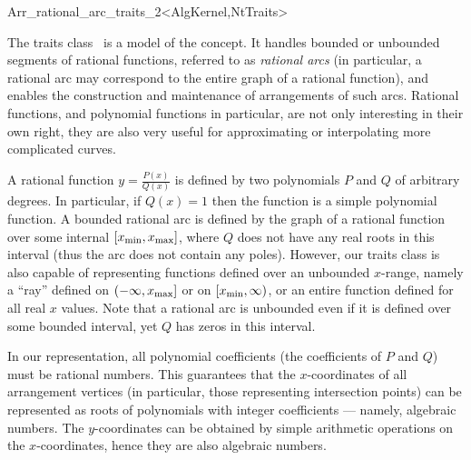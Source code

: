 
\ccRefPageBegin
\begin{ccRefClass}{Arr_rational_arc_traits_2<AlgKernel,NtTraits>}

\ccDefinition

The traits class \ccRefName\ is a model of the 
concept. It handles bounded or unbounded segments of rational functions,
referred to as {\sl rational arcs} (in particular, a rational arc may
correspond to the entire graph of a rational function), and enables the
construction and maintenance of arrangements of such arcs. Rational
functions, and polynomial functions in particular, are not only interesting
in their own right, they are also very useful for approximating or
interpolating more complicated curves.

A rational function $y = \frac{P(x)}{Q(x)}$
is defined by two polynomials $P$ and $Q$ of arbitrary degrees. In
particular, if $Q(x) = 1$ then the function is a simple polynomial
function. A bounded rational arc is defined by the graph of a rational
function over some internal $[x_{\rm min}, x_{\rm max}]$, where $Q$
does not have any real roots in this interval (thus the arc does not
contain any poles). However, our traits class is also capable of
representing functions defined over an unbounded $x$-range, namely
a ``ray'' defined on $(-\infty, x_{\rm max}]$ or on $[x_{\rm min}, \infty)$,
or an entire function defined for all real $x$ values. Note that a
rational arc is unbounded even if it is defined over some bounded interval,
yet $Q$ has zeros in this interval.

In our representation, all polynomial coefficients (the coefficients of $P$
and $Q$) must be rational numbers. This guarantees that the
$x$-coordinates of all arrangement vertices (in particular, those
representing intersection points) can be represented as roots of
polynomials with integer coefficients --- namely, algebraic numbers.
The $y$-coordinates can be obtained by simple arithmetic operations on
the $x$-coordinates, hence they are also algebraic numbers.


\end{ccRefClass}
